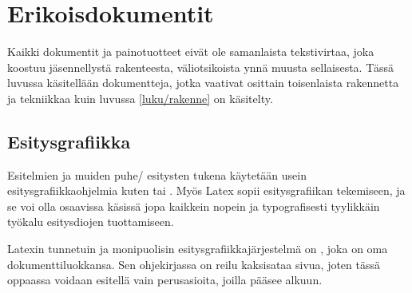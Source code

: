 
\chapter{Erikoisdokumentit}

Kaikki dokumentit ja painotuotteet eivät ole samanlaista tekstivirtaa,
joka koostuu jäsennellystä rakenteesta, väliotsikoista ynnä muusta
sellaisesta. Tässä luvussa käsitellään dokumentteja, jotka vaativat
osittain toisenlaista rakennetta ja tekniikkaa kuin luvussa
\ref{luku/rakenne} on käsitelty.

\section{Esitysgrafiikka}
\label{luku/esitysgrafiikka}

Esitelmien ja muiden puhe\-/ esitysten tukena käytetään usein
esitysgrafiikkaohjelmia kuten  tai
. Myös Latex sopii esitysgrafiikan
tekemiseen, ja se voi olla osaavissa käsissä jopa kaikkein nopein ja
typografisesti tyylikkäin työkalu esitysdiojen tuottamiseen.

Latexin tunnetuin ja monipuolisin esitysgrafiikkajärjestelmä on
, joka on oma dokumenttiluokkansa. Sen ohjekirjassa
on reilu kaksisataa sivua, joten tässä oppaassa voidaan esitellä vain
perusasioita, joilla pääsee alkuun.

